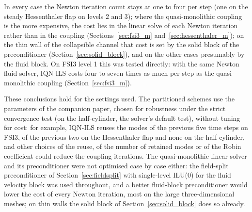 In every case the Newton iteration count stays at one to four per step (one on the steady Hessenthaler flap on levels 2 and 3); where the quasi-monolithic coupling is the more expensive, the cost lies in the linear solve of each Newton iteration rather than in the coupling (Sections~\ref{sec:fsi3_m} and~\ref{sec:hessenthaler_m}); on the thin wall of the collapsible channel that cost is set by the solid block of the preconditioner (Section~\ref{sec:solid_block}), and on the other cases presumably by the fluid block.
On FSI3 level 1 this was tested directly: with the same Newton fluid solver, IQN-ILS costs four to seven times as much per step as the quasi-monolithic coupling (Section~\ref{sec:fsi3_m}).

These conclusions hold for the settings used.
The partitioned schemes use the parameters of the companion paper, chosen for robustness under the strict convergence test (on the half-cylinder, the solver's default test), without tuning for cost: for example, IQN-ILS reuses the modes of the previous five time steps on FSI3, of the previous two on the Hessenthaler flap and none on the half-cylinder, and other choices of the reuse, of the number of retained modes or of the Robin coefficient could reduce the coupling iterations.
The quasi-monolithic linear solver and its preconditioner were not optimised case by case either: the field-split preconditioner of Section~\ref{sec:fieldsplit} with single-level ILU(0) for the fluid velocity block was used throughout, and a better fluid-block preconditioner would lower the cost of every Newton iteration, most on the large three-dimensional meshes; on thin walls the solid block of Section~\ref{sec:solid_block} does so already.

